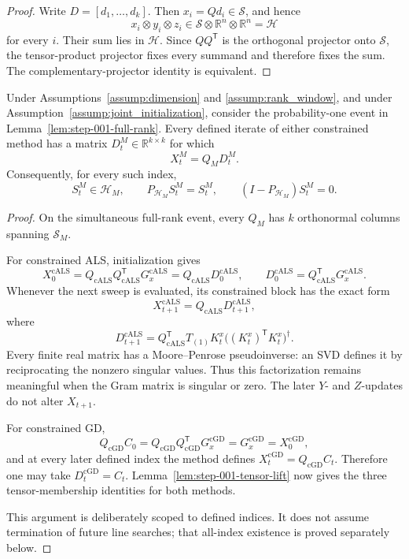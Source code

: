 \begin{proof}
Write $D=[d_1,\ldots,d_k]$.  Then $x_i=Qd_i\in\mathcal S$, and hence
\[
 x_i\otimes y_i\otimes z_i
 \in\mathcal S\otimes\mathbb R^n\otimes\mathbb R^n=\mathcal H
\]
for every $i$.  Their sum lies in $\mathcal H$.  Since $QQ^{\mathsf T}$ is
the orthogonal projector onto $\mathcal S$, the tensor-product projector
fixes every summand and therefore fixes the sum.  The complementary-projector
identity is equivalent.
\end{proof}

\begin{proposition}\label{prop:step-001-fixed-span}
Under Assumptions~\ref{assump:dimension} and \ref{assump:rank_window}, and
under Assumption~\ref{assump:joint_initialization}, consider the
probability-one event in Lemma~\ref{lem:step-001-full-rank}.  Every defined
iterate of either constrained method has a matrix
$D_t^M\in\mathbb R^{k\times k}$ for which
\[
 X_t^M=Q_MD_t^M.
\]
Consequently, for every such index,
\[
 S_t^M\in\mathcal H_M,
 \qquad
 P_{\mathcal H_M}S_t^M=S_t^M,
 \qquad
 (I-P_{\mathcal H_M})S_t^M=0.
\]
\end{proposition}

\begin{proof}
On the simultaneous full-rank event, every $Q_M$ has $k$ orthonormal columns
spanning $\mathcal S_M$.

For constrained ALS, initialization gives
\[
 X_0^{\mathrm{cALS}}
 =Q_{\mathrm{cALS}}Q_{\mathrm{cALS}}^{\mathsf T}
 G_x^{\mathrm{cALS}}
 =Q_{\mathrm{cALS}}D_0^{\mathrm{cALS}},
 \qquad
 D_0^{\mathrm{cALS}}
 =Q_{\mathrm{cALS}}^{\mathsf T}G_x^{\mathrm{cALS}}.
\]
Whenever the next sweep is evaluated, its constrained block has the exact
form
\[
 X_{t+1}^{\mathrm{cALS}}=Q_{\mathrm{cALS}}D_{t+1}^{\mathrm{cALS}},
\]
where
\[
 D_{t+1}^{\mathrm{cALS}}
 =Q_{\mathrm{cALS}}^{\mathsf T}T_{(1)}K_t^x
 \bigl((K_t^x)^{\mathsf T}K_t^x\bigr)^\dagger.
\]
Every finite real matrix has a Moore--Penrose pseudoinverse: an SVD defines
it by reciprocating the nonzero singular values.  Thus this factorization
remains meaningful when the Gram matrix is singular or zero.  The later
$Y$- and $Z$-updates do not alter $X_{t+1}$.

For constrained GD,
\[
 Q_{\mathrm{cGD}}C_0
 =Q_{\mathrm{cGD}}Q_{\mathrm{cGD}}^{\mathsf T}G_x^{\mathrm{cGD}}
 =G_x^{\mathrm{cGD}}=X_0^{\mathrm{cGD}},
\]
and at every later defined index the method defines
$X_t^{\mathrm{cGD}}=Q_{\mathrm{cGD}}C_t$.  Therefore one may take
$D_t^{\mathrm{cGD}}=C_t$.  Lemma~\ref{lem:step-001-tensor-lift} now gives
the three tensor-membership identities for both methods.

This argument is deliberately scoped to defined indices.  It does not assume
termination of future line searches; that all-index existence is proved
separately below.
\end{proof}

